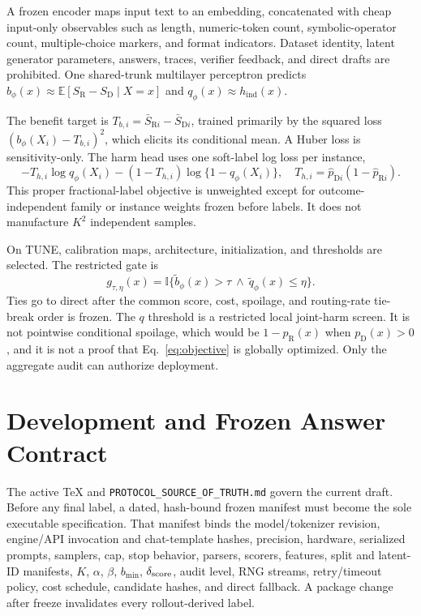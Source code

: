 \documentclass{article}
\newcommand{\D}{\ensuremath{\mathrm{D}}}
\newcommand{\Rpol}{\ensuremath{\mathrm{R}}}
\newcommand{\1}{\mathbb{I}}
\newcommand{\E}{\mathbb{E}}
\newcommand{\hInd}{h_{\mathrm{ind}}}
\begin{document}
A frozen encoder maps input text to an embedding, concatenated with cheap input-only observables such as length, numeric-token count, symbolic-operator count, multiple-choice markers, and format indicators. Dataset identity, latent generator parameters, answers, traces, verifier feedback, and direct drafts are prohibited. One shared-trunk multilayer perceptron predicts
$b_\phi(x)\approx\E[S_\Rpol-S_\D\mid X=x]$ and $q_\phi(x)\approx\hInd(x)$.

The benefit target is $T_{b,i}=\bar S_{\Rpol i}-\bar S_{\D i}$, trained primarily by the squared loss $(b_\phi(X_i)-T_{b,i})^2$, which elicits its conditional mean. A Huber loss is sensitivity-only. The harm head uses one soft-label log loss per instance,
\begin{equation}
 -T_{h,i}\log q_\phi(X_i)-(1-T_{h,i})\log\{1-q_\phi(X_i)\},
 \quad T_{h,i}=\widehat p_{\D i}(1-\widehat p_{\Rpol i}).
 \label{eq:harm-loss}
\end{equation}
This proper fractional-label objective \citep{gneiting2007strictly} is unweighted except for outcome-independent family or instance weights frozen before labels. It does not manufacture $K^2$ independent samples.

On TUNE, calibration maps, architecture, initialization, and thresholds are selected. The restricted gate is
\begin{equation}
 g_{\tau,\eta}(x)=\1\{\widetilde b_\phi(x)>\tau\ \land\ \widetilde q_\phi(x)\leq\eta\}.
 \label{eq:gate}
\end{equation}
Ties go to direct after the common score, cost, spoilage, and routing-rate tie-break order is frozen. The $q$ threshold is a restricted local joint-harm screen. It is not pointwise conditional spoilage, which would be $1-p_\Rpol(x)$ when $p_\D(x)>0$, and it is not a proof that Eq.~\ref{eq:objective} is globally optimized. Only the aggregate audit can authorize deployment.

\section{Development and Frozen Answer Contract}
The active TeX and \texttt{PROTOCOL\_SOURCE\_OF\_TRUTH.md} govern the current draft. Before any final label, a dated, hash-bound frozen manifest must become the sole executable specification. That manifest binds the model/tokenizer revision, engine/API invocation and chat-template hashes, precision, hardware, serialized prompts, samplers, cap, stop behavior, parsers, scorers, features, split and latent-ID manifests, $K$, $\alpha$, $\beta$, $b_{\min}$, $\delta_{\rm score}$, audit level, RNG streams, retry/timeout policy, cost schedule, candidate hashes, and direct fallback. A package change after freeze invalidates every rollout-derived label.
\end{document}

